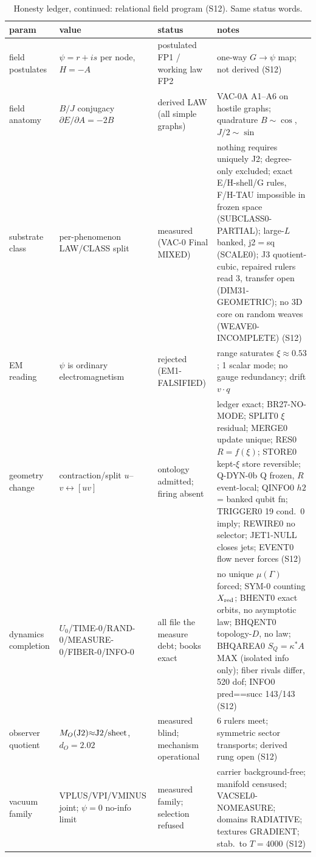 \documentclass[11pt]{article}
\begin{document}
\begin{table}[ht]\centering\scriptsize\renewcommand{\arraystretch}{0.84}
\caption{Honesty ledger, continued: relational field program (S12). Same status words.}
\begin{tabular}{@{}p{3.4cm} p{3.4cm} p{2.6cm} p{4.4cm}@{}}\toprule
param & value & status & notes \\\midrule
field postulates & $\psi{=}r{+}is$ per node, $H{=}{-}A$ & postulated FP1 / working law FP2 & one-way $G{\to}\psi$ map; not derived (S12) \\
field anatomy & $B/J$ conjugacy $\partial E/\partial A{=}{-}2B$ & derived LAW (all simple graphs) & VAC-0A A1--A6 on hostile graphs; quadrature $B{\sim}\cos$, $J/2{\sim}\sin$ \\
substrate class & per-phenomenon LAW/CLASS split & measured (VAC-0 Final MIXED) & nothing requires uniquely J2; degree-only excluded; exact E/H-shell/G rules, F/H-TAU impossible in frozen space (SUBCLASS0-PARTIAL); large-$L$ banked, j2${}={}$sq (SCALE0); J3 quotient-cubic, repaired rulers read 3, transfer open (DIM31-GEOMETRIC); no 3D core on random weaves (WEAVE0-INCOMPLETE) (S12) \\
EM reading & $\psi$ is ordinary electromagnetism & rejected (EM1-FALSIFIED) & range saturates $\xi{\approx}0.53$; 1 scalar mode; no gauge redundancy; drift $v{\cdot}q$ \\
geometry change & contraction/split $u$--$v{\leftrightarrow}[uv]$ & ontology admitted; firing absent & ledger exact; BR27-NO-MODE; SPLIT0 $\xi$ residual; MERGE0 update unique; RES0 $R{=}f(\xi)$; STORE0 kept-$\xi$ store reversible; Q-DYN-0b Q frozen, $R$ event-local; QINFO0 $h2$ = banked qubit fn; TRIGGER0 19 cond.\ 0 imply; REWIRE0 no selector; JET1-NULL closes jets; EVENT0 flow never forces (S12) \\
dynamics completion & $U_0$/TIME-0/RAND-0/MEASURE-0/FIBER-0/INFO-0 & all file the measure debt; books exact & no unique $\mu(\Gamma)$ forced; SYM-0 counting $X_{\rm red}$; BHENT0 exact orbits, no asymptotic law; BHQENT0 topology-$D$, no law; BHQAREA0 $S_Q{=}\kappa^*A$ MAX (isolated info only); fiber rivals differ, 520 dof; INFO0 pred==succ 143/143 (S12) \\
observer quotient & $M_O({\rm J2}){\approx}{\rm J2}/{\rm sheet}$, $d_O{=}2.02$ & measured blind; mechanism operational & 6 rulers meet; symmetric sector transports; derived rung open (S12) \\
vacuum family & VPLUS/VPI/VMINUS joint; $\psi{=}0$ no-info limit & measured family; selection refused & carrier background-free; manifold censused; VACSEL0-NOMEASURE; domains RADIATIVE; textures GRADIENT; stab.\ to $T{=}4000$ (S12) \\

\end{tabular}
\end{table}
\end{document}
